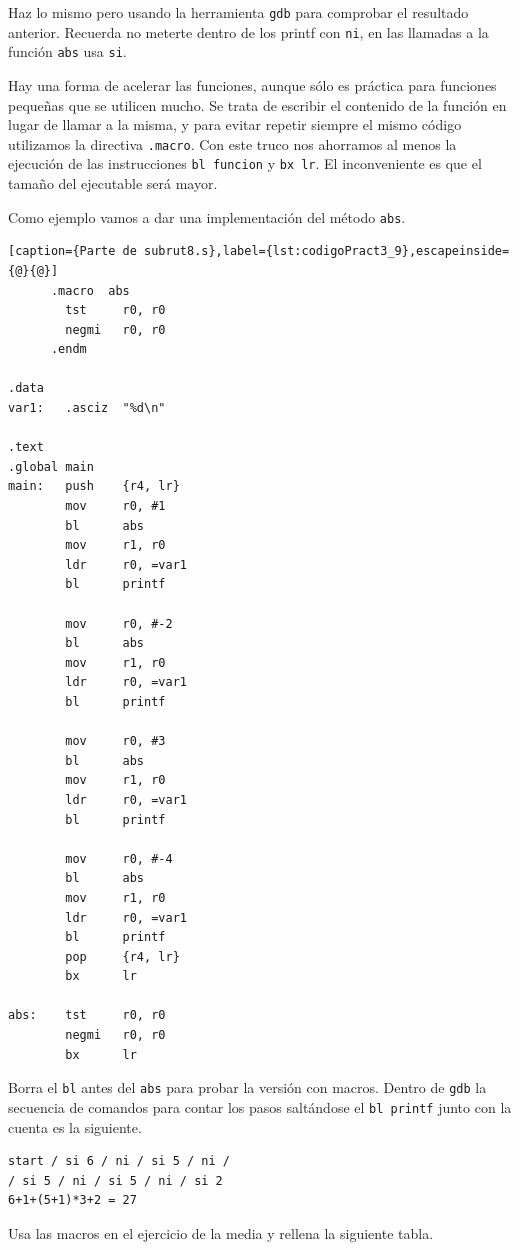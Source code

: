Haz lo mismo pero usando la herramienta {\tt gdb} para comprobar el resultado anterior.
Recuerda no meterte dentro de los printf con {\tt ni}, en las llamadas a la función
{\tt abs} usa {\tt si}.

Hay una forma de acelerar las funciones, aunque sólo es práctica para funciones pequeñas
que se utilicen mucho. Se trata de escribir el contenido de la función en lugar de
llamar a la misma, y para evitar repetir siempre el mismo código utilizamos la directiva
{\tt .macro}. Con este truco nos ahorramos al menos la ejecución de las instrucciones
{\tt bl funcion} y {\tt bx lr}. El inconveniente es que el tamaño del ejecutable será
mayor.

Como ejemplo vamos a dar una implementación del método {\tt abs}.

\begin{lstlisting}[caption={Parte de subrut8.s},label={lst:codigoPract3_9},escapeinside={@}{@}]
      .macro  abs
        tst     r0, r0
        negmi   r0, r0
      .endm

.data
var1:   .asciz  "%d\n"

.text
.global main
main:   push    {r4, lr}
        mov     r0, #1
        bl      abs
        mov     r1, r0
        ldr     r0, =var1
        bl      printf

        mov     r0, #-2
        bl      abs
        mov     r1, r0
        ldr     r0, =var1
        bl      printf

        mov     r0, #3
        bl      abs
        mov     r1, r0
        ldr     r0, =var1
        bl      printf

        mov     r0, #-4
        bl      abs
        mov     r1, r0
        ldr     r0, =var1
        bl      printf
        pop     {r4, lr}
        bx      lr

abs:    tst     r0, r0
        negmi   r0, r0
        bx      lr
\end{lstlisting}

Borra el {\tt bl} antes del {\tt abs} para probar la versión con macros. Dentro de 
{\tt gdb} la secuencia de comandos para contar los pasos saltándose el
{\tt bl printf} junto con la cuenta es la siguiente.

\begin{lstlisting}
start / si 6 / ni / si 5 / ni /
/ si 5 / ni / si 5 / ni / si 2
6+1+(5+1)*3+2 = 27
\end{lstlisting}

Usa las macros en el ejercicio de la media y rellena la siguiente tabla.

